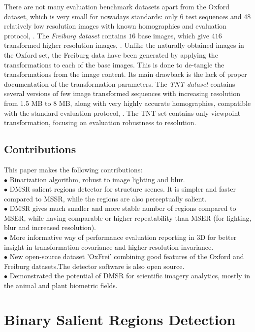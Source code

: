 \documentclass{article}
\begin{document}
There are not many evaluation benchmark datasets apart from the Oxford dataset, which is very small for nowadays standards: only $6$ test sequences and $48$ relatively low resolution images with known homographies and evaluation protocol, \cite{Mikolajczyk:2005}.  The {\em Freiburg dataset} contains $16$ base images, which give  $416$ transformed higher resolution images, \cite{FischerDB14}. Unlike the  naturally obtained images in the Oxford set, the Freiburg data have been generated by applying the transformations to each of the base images. This is done to de-tangle the transformations from the image content. Its main drawback is the lack of proper documentation of the transformation parameters. The {\em TNT dataset} contains several versions of few image transformed sequences with increasing resolution from $1.5$ MB to $8$ MB, along with very highly accurate homographies, compatible with the standard evaluation protocol, \cite{CorRos2013}. The TNT set contains only viewpoint transformation, focusing on evaluation robustness to resolution.


\subsection{Contributions}
\label{ssec:contr}

This paper makes the following contributions:\\
$\bullet$ Binarization algorithm, robust to image lighting and blur.\\
$\bullet$ DMSR salient regions detector for structure scenes. It is simpler and faster compared to MSSR, while the regions are also perceptually salient.\\
$\bullet$ DMSR gives much smaller and more stable number of regions compared to MSER, while having comparable or higher repeatability than MSER (for lighting, blur and increased resolution).\\
$\bullet$ More informative way of performance evaluation reporting in 3D for better insight in transformation covariance and higher resolution invariance.\\
$\bullet$ New open-source dataset 'OxFrei' combining good features of the Oxford and Freiburg datasets.The detector software is also open source.\\
$\bullet$ Demonstrated the potential of DMSR for scientific imagery analytics, mostly in the animal and plant biometric fields.



\section{Binary Salient Regions Detection}
\label{sec:binary}
\end{document}
